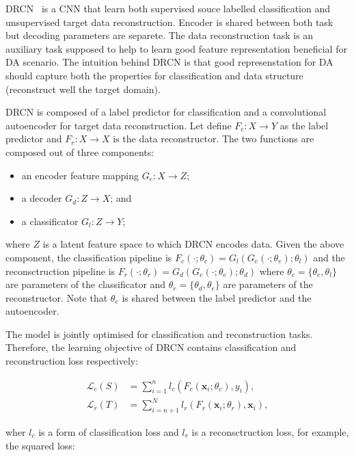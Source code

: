 DRCN~\cite{ghifary2016} is a CNN
that learn both supervised souce labelled classification
and unsupervised target data reconstruction.
Encoder is shared between both task but decoding parameters are separete.
The data reconstruction task is an auxiliary task
supposed to help to learn good feature representation
beneficial for DA scenario.
The intuition behind DRCN is that good represenstation for DA
should capture both the properties for classification
and data structure (reconstruct well the target domain).

DRCN is composed of a label predictor for classification
and a convolutional autoencoder for target data reconstruction.
Let define \(F_c: X \to Y\) as the label predictor
and \(F_r: X \to X\) is the data reconstructor.
The two functions are composed out of three components:

\begin{itemize}
	\item an encoder feature mapping \(G_e: X \to Z\);
	\item a decoder \(G_d: Z \to X\); and
	\item a classificator \(G_l: Z \to Y\);
\end{itemize}

where \(Z\) is a latent feature space to which DRCN encodes data.
Given the above component,
the classification pipeline is \(F_c(\cdot; \theta_c) = G_l(G_e(\cdot; \theta_e); \theta_l)\)
and the reconsctruction pipeline is \(F_r(\cdot; \theta_r) = G_d(G_e(\cdot; \theta_e); \theta_d)\)
where \(\theta_c = \{\theta_e, \theta_l\}\) are parameters of the classificator
and \(\theta_r = \{\theta_d, \theta_e\}\) are parameters of the reconstructor.
Note that \(\theta_e\) is shared between the label predictor and the autoencoder.

The model is jointly optimised for classification and reconstruction tasks.
Therefore, the learning objective of DRCN contains classification and reconstruction loss respectively:

\begin{align}
	\mathcal{L}_c(S) &= \sum_{i = 1}^{n}
	l_c(F_c(\mathbf{x}_i; \theta_c), y_i),
	\label{drcn_classification_loss} \\
	\mathcal{L}_r(T) &= \sum_{i = n + 1}^{N}
	l_r(F_r(\mathbf{x}_i; \theta_r), \mathbf{x}_i),
	\label{drcn_reconstruction_loss}
\end{align}

wher \(l_c\) is a form of classification loss
and \(l_r\) is a reconsctruction loss, for example, the squared loss:

